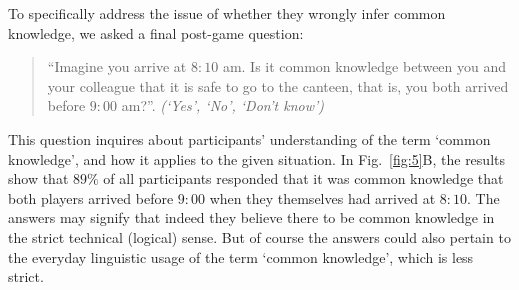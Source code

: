 To specifically address the issue of whether they wrongly infer common knowledge, we asked a final post-game question:

\begin{quote}
\indent
``Imagine you arrive at $8{:}10$ am. Is it common knowledge between you and your colleague that it is safe to go to the canteen, that is, you both arrived before $9{:}00$ am?''. \textit{(`Yes', `No', `Don't know')}
\end{quote}

\noindent
This question inquires about participants' understanding of the term `common knowledge', and how it applies to the given situation. In Fig.~\ref{fig:5}B, the results show that $89\%$ of all participants responded that it was common knowledge that both players arrived before $9{:}00$ when they themselves had arrived at $8{:}10$. The answers may signify that indeed they believe there to be common knowledge in the strict technical (logical) sense. But of course the answers could also pertain to the everyday linguistic usage of the term `common knowledge', which is less strict.







